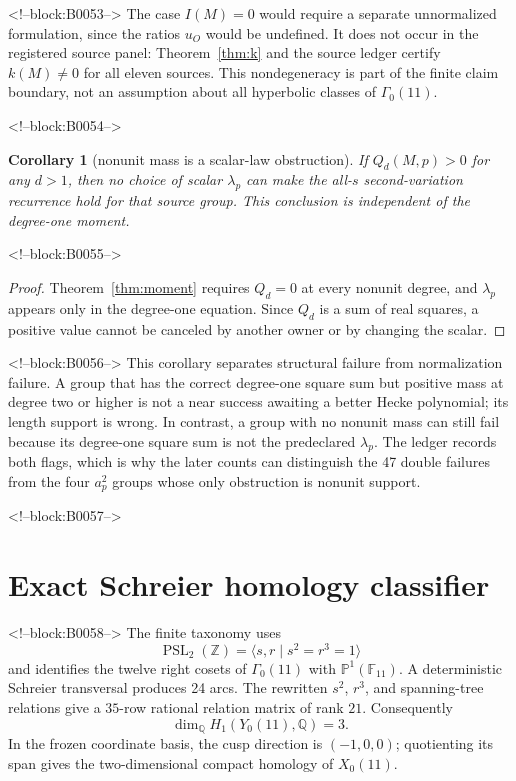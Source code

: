 \documentclass[11pt]{article}
\newtheorem{corollary}[theorem]{Corollary}
\theoremstyle{definition}
\theoremstyle{remark}
\newcommand{\G}{\Gamma_0(11)}
\newcommand{\QQ}{\mathbb Q}
\begin{document}
<!--block:B0053-->
The case $I(M)=0$ would require a separate unnormalized formulation, since the ratios $u_O$ would be undefined. It does not occur in the registered source panel: Theorem~\ref{thm:k} and the source ledger certify $k(M)\neq0$ for all eleven sources. This nondegeneracy is part of the finite claim boundary, not an assumption about all hyperbolic classes of $\G$.

<!--block:B0054-->
\begin{corollary}[nonunit mass is a scalar-law obstruction]\label{cor:nonunit}
If $Q_d(M,p)>0$ for any $d>1$, then no choice of scalar $\lambda_p$ can make the all-$s$ second-variation recurrence hold for that source group. This conclusion is independent of the degree-one moment.
\end{corollary}

<!--block:B0055-->
\begin{proof}
Theorem~\ref{thm:moment} requires $Q_d=0$ at every nonunit degree, and $\lambda_p$ appears only in the degree-one equation. Since $Q_d$ is a sum of real squares, a positive value cannot be canceled by another owner or by changing the scalar.
\end{proof}

<!--block:B0056-->
This corollary separates structural failure from normalization failure. A group that has the correct degree-one square sum but positive mass at degree two or higher is not a near success awaiting a better Hecke polynomial; its length support is wrong. In contrast, a group with no nonunit mass can still fail because its degree-one square sum is not the predeclared $\lambda_p$. The ledger records both flags, which is why the later counts can distinguish the 47 double failures from the four $a_p^2$ groups whose only obstruction is nonunit support.

<!--block:B0057-->
\section{Exact Schreier homology classifier}

<!--block:B0058-->
The finite taxonomy uses
\[
\operatorname{PSL}_2(\mathbb Z)=\langle s,r\mid s^2=r^3=1\rangle
\]
and identifies the twelve right cosets of $\G$ with $\mathbb P^1(\mathbb F_{11})$. A deterministic Schreier transversal produces 24 arcs. The rewritten $s^2$, $r^3$, and spanning-tree relations give a $35$-row rational relation matrix of rank $21$. Consequently
\[
\dim_\QQ H_1(Y_0(11),\QQ)=3.
\]
In the frozen coordinate basis, the cusp direction is $(-1,0,0)$; quotienting its span gives the two-dimensional compact homology of $X_0(11)$.
\end{document}

